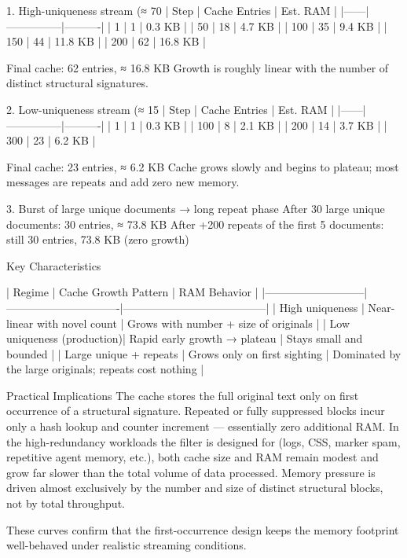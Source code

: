 1. High-uniqueness stream (≈ 70 %
| Step | Cache Entries | Est. RAM |
|------|---------------|----------|
| 1    | 1             | 0.3 KB   |
| 50   | 18            | 4.7 KB   |
| 100  | 35            | 9.4 KB   |
| 150  | 44            | 11.8 KB  |
| 200  | 62            | 16.8 KB  |

Final cache: 62 entries, ≈ 16.8 KB
Growth is roughly linear with the number of distinct structural signatures.

2. Low-uniqueness stream (≈ 15 %
| Step | Cache Entries | Est. RAM |
|------|---------------|----------|
| 1    | 1             | 0.3 KB   |
| 100  | 8             | 2.1 KB   |
| 200  | 14            | 3.7 KB   |
| 300  | 23            | 6.2 KB   |

Final cache: 23 entries, ≈ 6.2 KB
Cache grows slowly and begins to plateau; most messages are repeats and add zero new memory.

3. Burst of large unique documents → long repeat phase
After 30 large unique documents: 30 entries, ≈ 73.8 KB
After +200 repeats of the first 5 documents: still 30 entries, 73.8 KB (zero growth)

Key Characteristics

| Regime                    | Cache Growth Pattern          | RAM Behavior                          |
|---------------------------|-------------------------------|---------------------------------------|
| High uniqueness           | Near-linear with novel count  | Grows with number + size of originals |
| Low uniqueness (production)| Rapid early growth → plateau | Stays small and bounded               |
| Large unique + repeats    | Grows only on first sighting  | Dominated by the large originals; repeats cost nothing |

Practical Implications
The cache stores the full original text only on first occurrence of a structural signature.
Repeated or fully suppressed blocks incur only a hash lookup and counter increment — essentially zero additional RAM.
In the high-redundancy workloads the filter is designed for (logs, CSS, marker spam, repetitive agent memory, etc.), both cache size and RAM remain modest and grow far slower than the total volume of data processed.
Memory pressure is driven almost exclusively by the number and size of distinct structural blocks, not by total throughput.

These curves confirm that the first-occurrence design keeps the memory footprint well-behaved under realistic streaming conditions.


